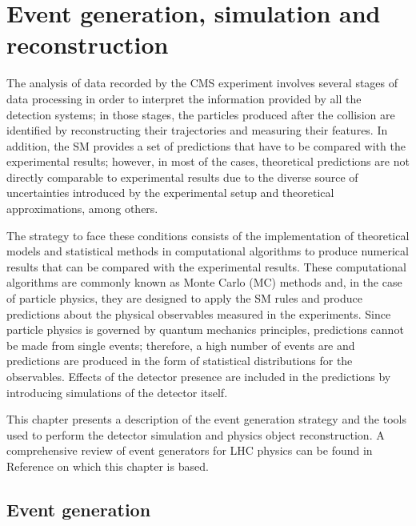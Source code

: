 \chapter{Event generation, simulation and reconstruction}\label{ch:gensimreco}

The analysis of data recorded by the CMS experiment involves several stages of data processing in order to interpret the information provided by all the detection systems; in those stages, the particles produced after the \pp collision are identified by reconstructing their trajectories and measuring their features. In addition, the SM provides a set of predictions that have to be compared with the experimental results; however, in most of the cases, theoretical predictions are not directly comparable to experimental results due to the diverse source of uncertainties introduced by the experimental setup and theoretical approximations, among others.

The strategy to face these conditions consists of the implementation of theoretical models and statistical methods in computational algorithms to produce numerical results that can be compared with the experimental results. These computational algorithms are commonly known as Monte Carlo (MC) methods and, in the case of particle physics, they are designed to apply the SM rules and produce predictions about the physical observables measured in the experiments. Since particle physics is governed by quantum mechanics principles, predictions cannot be made from single events; therefore, a high number of events are  and predictions are produced in the form of statistical distributions for the observables. Effects of the detector presence are included in the predictions by introducing simulations of the detector itself.

This chapter presents a description of the event generation strategy and the tools used to perform the detector simulation and physics object reconstruction. A comprehensive review of event generators for LHC physics can be found in Reference \cite{gen} on which this chapter is based.  

\section{Event generation}

